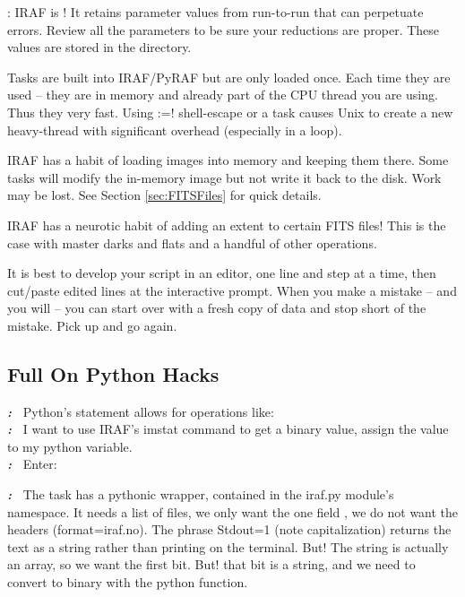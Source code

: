 \documentclass[letter,11pt,oneside]{article}
\makeatletter
\newcommand\llbox[1]{%
  \@tfor\@ii:=#1\do{%
    {\color{verbcolor}\Ovalbox{\strut\@ii}}%
  }%
}
\newcommand{\dhl}[1]{{\color{verbcolor}{\texttt#1}}}
\newcounter{teachcounter}
\newcommand{\exercise}[1][] {\textbf{\emph{\color{verbcolor}{Exercise} \theteachcounter #1:}~ }}
\newcommand{\example}  {\textbf{\emph{\color{verbcolor}{Example} \theteachcounter :}~ }}
\newcommand{\prose}    {\textbf{\emph{\color{verbcolor}{Prose} \theteachcounter :}~ }}
\newcommand{\takeaway} {\textbf{\emph{\color{verbcolor}{Take Away} \theteachcounter :}~ }}
\makeatother
\begin{document}
\dhl{BEWARE}: IRAF is \dhl{sticky}! It retains parameter values from
run-to-run that can perpetuate errors. Review all the parameters to be
sure your reductions are proper. These values are stored in the
\dhl{~/iraf/uparm} directory.

Tasks are built into IRAF/PyRAF but are only loaded once. Each time
they are used -- they are in memory and already part of the CPU thread
you are using. Thus they very fast. Using \llbox{!} shell-escape or a
\dhl{\$foreign} task causes Unix to create a new heavy-thread with
significant overhead (especially in a loop).

IRAF has a habit of loading images into memory and keeping them there.
Some tasks will modify the in-memory image but not write it back to
the disk. Work may be lost. See Section \ref{sec:FITSFiles} for quick
details.

IRAF has a neurotic habit of \dhl{sometimes} adding an extent to
certain FITS files! This is the case with master darks and flats
and a handful of other operations.

It is best to develop your \dhl{reduce.pyraf} script in an editor, one line
and step at a time, then cut/paste edited lines at the interactive
prompt. When you make a mistake -- and you will -- you can start over
with a fresh copy of data and stop short of the mistake. Pick up and
go again.

\subsection{Full On Python Hacks}

\example Python's \dhl{import iraf} statement allows for operations like: \\
\prose I want to use IRAF's imstat command to get a binary value, assign
the value to my python variable. \\
\exercise Enter: \\
{}

\takeaway The task has a pythonic wrapper, contained in the iraf.py
module's namespace.  It needs a list of files, we only want the one
field \dhl{mean}, we do not want the headers (format=iraf.no). The
phrase Stdout=1 (note capitalization) returns the text as a string
rather than printing on the terminal. But! The string is actually an
array, so we want the first bit. But! that bit is a string, and we
need to convert to binary with the \dhl{float} python function.
\end{document}
